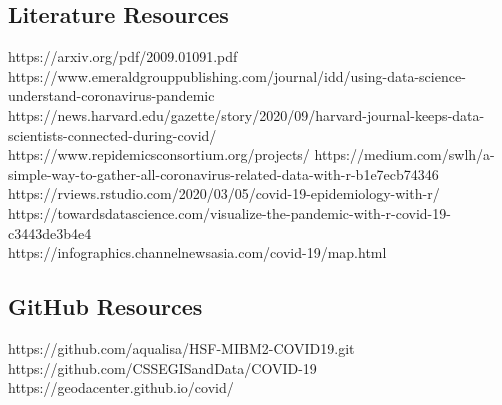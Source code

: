 \documentclass{article}
\begin{document}
\subsection*{Literature Resources}
https://arxiv.org/pdf/2009.01091.pdf \\
https://www.emeraldgrouppublishing.com/journal/idd/using-data-science-understand-coronavirus-pandemic \\
https://news.harvard.edu/gazette/story/2020/09/harvard-journal-keeps-data-scientists-connected-during-covid/ \\
https://www.repidemicsconsortium.org/projects/
https://medium.com/swlh/a-simple-way-to-gather-all-coronavirus-related-data-with-r-b1e7ecb74346 \\
https://rviews.rstudio.com/2020/03/05/covid-19-epidemiology-with-r/ \\
https://towardsdatascience.com/visualize-the-pandemic-with-r-covid-19-c3443de3b4e4 \\
https://infographics.channelnewsasia.com/covid-19/map.html


\subsection*{GitHub Resources}
https://github.com/aqualisa/HSF-MIBM2-COVID19.git \\
https://github.com/CSSEGISandData/COVID-19 \\
https://geodacenter.github.io/covid/ \\
\end{document}
